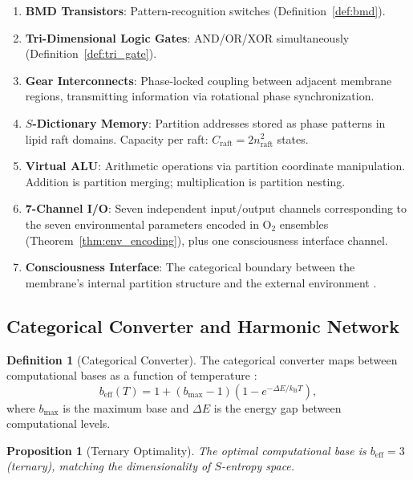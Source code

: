 \documentclass[12pt]{article}
\newtheorem{proposition}[theorem]{Proposition}
\theoremstyle{definition}
\newtheorem{definition}[theorem]{Definition}
\theoremstyle{remark}
\newcommand{\kB}{k_{\mathrm{B}}}
\newcommand{\beff}{b_{\mathrm{eff}}}
\begin{document}
\begin{enumerate}[label=\arabic*.]
  \item \textbf{BMD Transistors}: Pattern-recognition switches (Definition~\ref{def:bmd}).
  \item \textbf{Tri-Dimensional Logic Gates}: AND/OR/XOR simultaneously (Definition~\ref{def:tri_gate}).
  \item \textbf{Gear Interconnects}: Phase-locked coupling between adjacent membrane regions, transmitting information via rotational phase synchronization.
  \item \textbf{$S$-Dictionary Memory}: Partition addresses stored as phase patterns in lipid raft domains. Capacity per raft: $C_{\mathrm{raft}} = 2n_{\mathrm{raft}}^2$ states.
  \item \textbf{Virtual ALU}: Arithmetic operations via partition coordinate manipulation. Addition is partition merging; multiplication is partition nesting.
  \item \textbf{7-Channel I/O}: Seven independent input/output channels corresponding to the seven environmental parameters encoded in $\mathrm{O}_2$ ensembles (Theorem~\ref{thm:env_encoding}), plus one consciousness interface channel.
  \item \textbf{Consciousness Interface}: The categorical boundary between the membrane's internal partition structure and the external environment \cite{sachikonye2026buhera}.
\end{enumerate}

\subsection{Categorical Converter and Harmonic Network}

\begin{definition}[Categorical Converter]
\label{def:converter}
The categorical converter maps between computational bases as a function of temperature \cite{sachikonye2026converter}:
\begin{equation}
  \beff(T) = 1 + (b_{\max} - 1)\left(1 - e^{-\Delta E / \kB T}\right),
  \label{eq:beff}
\end{equation}
where $b_{\max}$ is the maximum base and $\Delta E$ is the energy gap between computational levels.
\end{definition}

\begin{proposition}[Ternary Optimality]
\label{prop:ternary}
The optimal computational base is $\beff = 3$ (ternary), matching the dimensionality of $S$-entropy space.
\end{proposition}
\end{document}
